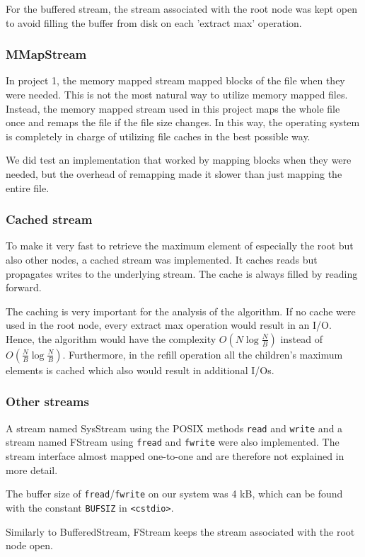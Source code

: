 
For the buffered stream, the stream associated with the root node was kept open to avoid filling the buffer from disk on each 'extract max' operation.

\subsubsection{MMapStream}

In project 1, the memory mapped stream mapped blocks of the file when they were needed. This is not the most natural way to utilize memory mapped files. Instead, the memory mapped stream used in this project maps the whole file once and remaps the file if the file size changes. In this way, the operating system is completely in charge of utilizing file caches in the best possible way.

We did test an implementation that worked by mapping blocks when they were needed, but the overhead of remapping made it slower than just mapping the entire file.

\subsubsection{Cached stream}

To make it very fast to retrieve the maximum element of especially the root but also other nodes, a cached stream was implemented. It caches reads but propagates writes to the underlying stream. The cache is always filled by reading forward.

The caching is very important for the analysis of the algorithm. If no cache were used in the root node, every extract max operation would result in an I/O. Hence, the algorithm would have the complexity $O(N\log \frac{N}{B})$ instead of $O(\frac{N}{B}\log \frac{N}{B})$. Furthermore, in the refill operation all the children's maximum elements is cached which also would result in additional I/Os.

\subsubsection{Other streams}

A stream named SysStream using the POSIX methods \texttt{read} and \texttt{write} and a stream named FStream using \texttt{fread} and \texttt{fwrite} were also implemented. The stream interface almost mapped one-to-one and are therefore not explained in more detail.

The buffer size of \texttt{fread}/\texttt{fwrite} on our system was 4 kB, which can be found with the constant \texttt{BUFSIZ} in \texttt{<cstdio>}.

Similarly to BufferedStream, FStream keeps the stream associated with the root node open.

